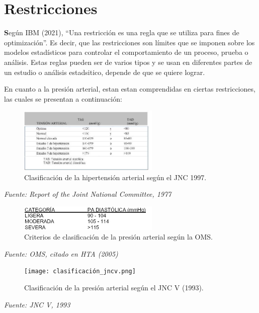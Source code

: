\documentclass[a4paper,10pt]{article}
\begin{document}
\section*{Restricciones}
\textbf Según IBM (2021), ``Una restricción es una regla que se utiliza para fines de optimización''. Es decir, que las restricciones son límites que se imponen sobre los modelos estadísticos para controlar el comportamiento de un proceso, prueba o análisis. Estas reglas pueden ser de varios tipos y se usan en diferentes partes de un estudio o análisis estadsitico, depende de que se quiere lograr.

En cuanto a la presión arterial, estan estan comprendidas en ciertas restricciones, las cuales se presentan a continuación:

\vspace{1em}
\begin{figure}[H]
    \centering
    \includegraphics[width=0.6\textwidth]{clasificacion_jnc.png}
    \caption{Clasificación de la hipertensión arterial según el JNC 1997.}
    \label{fig:jnc1997}
\end{figure}
\textit{Fuente: Report of the Joint National Committee, 1977}
\vspace{2em}

\vspace{1em}
\begin{figure}[H]
    \centering
    \includegraphics[width=0.6\textwidth]{criterios_oms.png}
    \caption{Criterios de clasificación de la presión arterial según la OMS.}
    \label{fig:oms}
\end{figure}

\textit{Fuente: OMS, citado en HTA (2005)}
\vspace{2em}

\vspace{1em}
\begin{figure}[H]
    \centering
    \texttt{[image: clasificación\_jncv.png]}
    \caption{Clasificación de la presión arterial según el JNC V (1993).}
    \label{fig:jncv}
\end{figure}
\textit{Fuente: JNC V, 1993}
\end{document}
